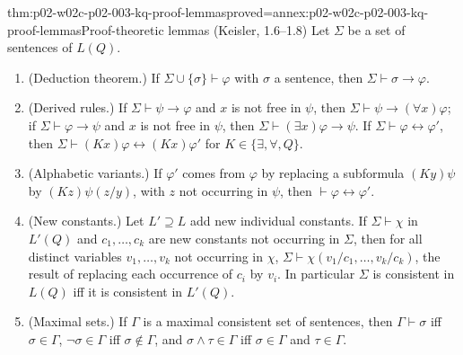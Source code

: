 \begin{hblemma}{thm:p02-w02c-p02-003-kq-proof-lemmas}{proved=annex:p02-w02c-p02-003-kq-proof-lemmas}{Proof-theoretic lemmas (Keisler, 1.6--1.8)}
Let \(\Sigma\) be a set of sentences of \(L(Q)\).
\begin{enumerate}
\item (Deduction theorem.)  If \(\Sigma\cup\{\sigma\}\vdash\varphi\) with
      \(\sigma\) a sentence, then \(\Sigma\vdash\sigma\to\varphi\).
\item (Derived rules.)  If \(\Sigma\vdash\psi\to\varphi\) and \(x\) is not
      free in \(\psi\), then \(\Sigma\vdash\psi\to(\forall x)\varphi\); if
      \(\Sigma\vdash\varphi\to\psi\) and \(x\) is not free in \(\psi\), then
      \(\Sigma\vdash(\exists x)\varphi\to\psi\).  If
      \(\Sigma\vdash\varphi\leftrightarrow\varphi'\), then
      \(\Sigma\vdash(Kx)\varphi\leftrightarrow(Kx)\varphi'\) for
      \(K\in\{\exists,\forall,Q\}\).
\item (Alphabetic variants.)  If \(\varphi'\) comes from \(\varphi\) by
      replacing a subformula \((Ky)\psi\) by \((Kz)\psi(z/y)\), with
      \(z\) not occurring in \(\psi\), then \(\vdash\varphi\leftrightarrow\varphi'\).
\item (New constants.)  Let \(L'\supseteq L\) add new individual
      constants.  If \(\Sigma\vdash\chi\) in \(L'(Q)\) and
      \(c_1,\ldots,c_k\) are new constants not occurring in \(\Sigma\), then
      for all distinct variables \(v_1,\ldots,v_k\) not occurring in \(\chi\),
      \(\Sigma\vdash\chi(v_1/c_1,\ldots,v_k/c_k)\), the result of replacing
      each occurrence of \(c_i\) by \(v_i\).  In particular \(\Sigma\) is
      consistent in \(L(Q)\) iff it is consistent in \(L'(Q)\).
\item (Maximal sets.)  If \(\Gamma\) is a maximal consistent set of
      sentences, then \(\Gamma\vdash\sigma\) iff \(\sigma\in\Gamma\),
      \(\neg\sigma\in\Gamma\) iff \(\sigma\notin\Gamma\), and
      \(\sigma\land\tau\in\Gamma\) iff \(\sigma\in\Gamma\) and \(\tau\in\Gamma\).
\end{enumerate}
\end{hblemma}

